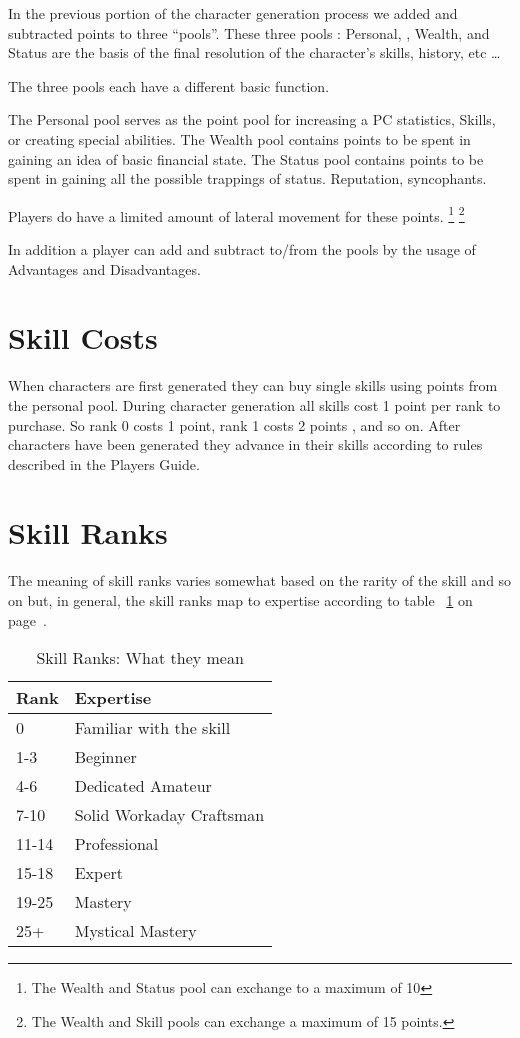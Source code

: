 In the previous portion of the character generation process we added
and subtracted points to three ``pools''. These three pools : Personal,
, Wealth, and Status are the basis of the final resolution of
the character's skills, history, etc \dots

The three pools each have a different basic function.

The Personal pool serves as the point pool for
increasing a PC statistics, Skills,  or creating special abilities.
The Wealth pool contains points to be spent in gaining an idea of
basic financial state.
The Status pool contains points to be spent in gaining all the
possible trappings of status. Reputation, syncophants.

Players do have a limited amount of lateral movement for these
points. \footnote{The Wealth and Status pool can exchange to a maximum of 10}
\footnote{The Wealth and Skill pools can exchange a maximum of 15 points.}

In addition a player can add and subtract to/from the pools by the
usage of Advantages and Disadvantages.

\section{Skill Costs}

When characters are first generated they can buy single skills
using points from the personal pool. During character generation all skills cost 1 point per
rank to purchase. So rank 0 costs 1 point, rank 1 costs 2 points , and so
on. After characters have been generated they advance in their skills
according to rules described in the Players Guide.

\section{Skill Ranks}

The meaning of skill ranks varies somewhat based on the rarity of the skill and
so on but, in general, the skill ranks map to expertise according to table
~\ref{Table:SkillRanks} on page~\pageref{Table:SkillRanks}.

\begin{table}\label{Table:SkillRanks}
	\begin{tabular}{ll}
    Rank & Expertise \\
\hline
	0           & Familiar with the skill \\
	1-3         & Beginner \\
	4-6         & Dedicated Amateur \\
	7-10        & Solid Workaday Craftsman \\
	11-14       & Professional \\
	15-18       & Expert \\
	19-25       & Mastery \\
	25+         & Mystical Mastery \\
	\end{tabular}
    \caption{Skill Ranks: What they mean}
\end{table}

